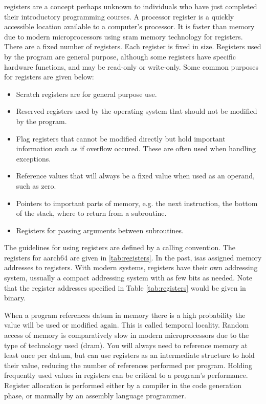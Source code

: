 \documentclass[letterpaper, 12pt]{book}
\begin{document}
\Glspl{register} are a concept perhaps unknown to individuals who have just completed their 
introductory programming courses. A processor \gls{register} is a quickly accessible location available 
to a computer's processor. %
It is faster than memory due to modern microprocessors using \gls{sram} memory technology for registers. %
There are a fixed number of registers. Each register is fixed in size. Registers used by the program are 
general purpose, although some registers 
have specific hardware functions, and may be read-only or write-only. Some common purposes for registers are given below:
%
\begin{itemize}
    \item Scratch registers are for general purpose use.
    \item Reserved registers used by the operating system that should not be modified by the program.
    \item Flag registers that cannot be modified directly but hold important information such as if overflow occured. These are often used when handling exceptions.
    \item Reference values that will always be a fixed value when used as an operand, such as zero.
    \item Pointers to important parts of memory, e.g. the next instruction, the bottom of the stack, where to return from a subroutine.
    \item Registers for passing arguments between subroutines.
\end{itemize}
%
The guidelines for using registers are defined by
a \gls{calling convention}. The registers for \gls{aarch64} are given in \ref{tab:registers}. %
%
In the past, \glspl{isa} assigned memory %
addresses to registers. With modern systems, registers have their own addressing system, ussually a 
compact addressing system with as few bits as needed. Note that the register addresses specified in 
Table \ref{tab:registers} would be given in binary.

When a program references datum in memory there is a high probability the value will be used or modified again. 
This is called \gls{temporal locality}. Random access of memory is comparatively slow in modern microprocessors 
due to the type of technology used (\gls{dram}). You will always need to reference memory at least once per datum, 
but can use registers as an intermediate structure to hold their value, reducing the number of references performed 
per program. Holding frequently used values in registers can be critical to a program's performance. Register 
allocation is performed either by a compiler in the code generation phase, or manually by an assembly language 
programmer. 
\end{document}
